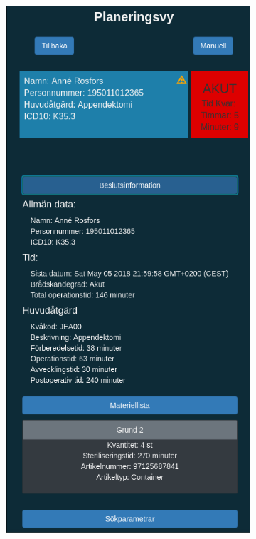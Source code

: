 \begin{figure}[H]
  \centering
  \begin{subfigure}[b]{0.4\linewidth}
    \includegraphics[width=\linewidth]{Figures/planning.png}

\end{subfigure}
\end{figure}
